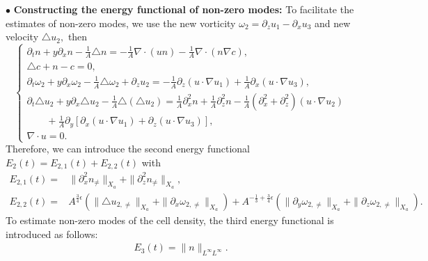 \documentclass[12pt, reqno]{amsart}
\numberwithin{equation}{section}
\begin{document}
	$\bullet$ {\bf Constructing the energy functional of non-zero modes:}
	To facilitate the estimates of non-zero modes, we use the new vorticity  $\omega_2=\partial_zu_1-\partial_xu_3$ and new velocity $\triangle u_2,$ then 
	\begin{equation}\label{ini2}
		\left\{
		\begin{array}{lr}
			\partial_tn+y\partial_x n-\frac{1}{A}\triangle n=-\frac{1}{A}\nabla\cdot(u n)-\frac{1}{A}\nabla\cdot(n\nabla c), \\
			\triangle c+n-c=0, \\
			\partial_t\omega_2+y\partial_x\omega_2
			-\frac{1}{A}\triangle\omega_2+\partial_zu_2=
			-\frac{1}{A}\partial_z(u\cdot\nabla u_1)+\frac{1}{A}\partial_x(u\cdot\nabla u_3), \\
			\partial_t\triangle u_2+y\partial_x \triangle u_2
			-\frac{1}{A}\triangle(\triangle u_2) =\frac{1}{A}\partial_x^2n+\frac{1}{A}\partial_z^2n 
			-\frac{1}{A}(\partial_x^2+\partial_z^2)(u\cdot\nabla u_2)\\
			\qquad
			+\frac{1}{A}\partial_y[\partial_x(u\cdot\nabla u_1)+\partial_z(u\cdot\nabla u_3)], \\
			\nabla \cdot u=0.
		\end{array}
		\right.
	\end{equation}
	Therefore, we can introduce the second energy functional 
	$E_2(t)=E_{2,1}(t)+E_{2,2}(t)$ with 
	\begin{equation*}\label{eq:E2}
		\begin{aligned}
			E_{2,1}(t)=&\|\partial_x^2n_{\neq}\|_{X_a}
			+\|\partial_z^2n_{\neq}\|_{X_a},\\
			E_{2,2}(t)=&A^{\frac{3}{4}\epsilon}(\|\triangle u_{2,\neq}\|_{X_a}+\|\partial_x\omega_{2,\neq}\|_{X_a})
			+A^{-\frac{1}{3}+\frac{3}{4}\epsilon}(\|\partial_y\omega_{2,\neq}\|_{X_a}
			+\|\partial_z\omega_{2,\neq}\|_{X_a}).
		\end{aligned}
	\end{equation*}
	To estimate  non-zero modes of the cell density, the third energy functional is introduced as follows:
	\begin{equation*}\label{eq:E3}
		\begin{aligned}
			E_{3}(t)=\|n\|_{L^{\infty}L^{\infty}}.
		\end{aligned}
	\end{equation*}
	
\end{document}
